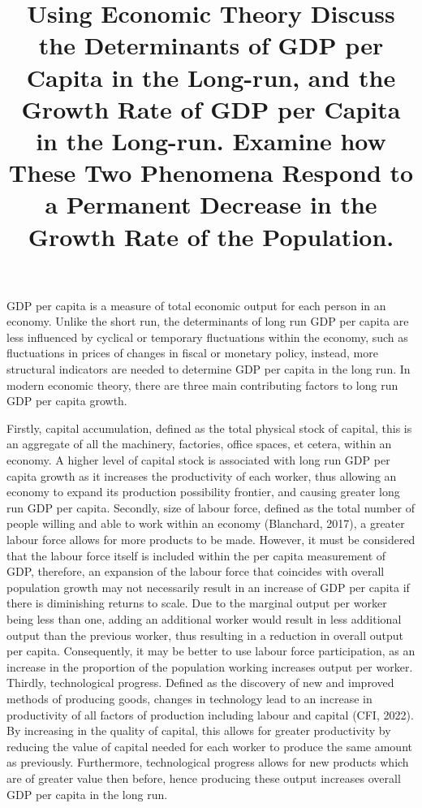 \documentclass[
]{article}
\title{Using Economic Theory Discuss the Determinants of GDP per Capita
in the Long-run, and the Growth Rate of GDP per Capita in the Long-run.
Examine how These Two Phenomena Respond to a Permanent Decrease in the
Growth Rate of the Population.}
\author{}
\date{}
\begin{document}
\maketitle

GDP per capita is a measure of total economic output for each person in
an economy. Unlike the short run, the determinants of long run GDP per
capita are less influenced by cyclical or temporary fluctuations within
the economy, such as fluctuations in prices of changes in fiscal or
monetary policy, instead, more structural indicators are needed to
determine GDP per capita in the long run. In modern economic theory,
there are three main contributing factors to long run GDP per capita
growth.

Firstly, capital accumulation, defined as the total physical stock of
capital, this is an aggregate of all the machinery, factories, office
spaces, et cetera, within an economy. A higher level of capital stock is
associated with long run GDP per capita growth as it increases the
productivity of each worker, thus allowing an economy to expand its
production possibility frontier, and causing greater long run GDP per
capita. Secondly, size of labour force, defined as the total number of
people willing and able to work within an economy (Blanchard, 2017), a
greater labour force allows for more products to be made. However, it
must be considered that the labour force itself is included within the
per capita measurement of GDP, therefore, an expansion of the labour
force that coincides with overall population growth may not necessarily
result in an increase of GDP per capita if there is diminishing returns
to scale. Due to the marginal output per worker being less than one,
adding an additional worker would result in less additional output than
the previous worker, thus resulting in a reduction in overall output per
capita. Consequently, it may be better to use labour force
participation, as an increase in the proportion of the population
working increases output per worker. Thirdly, technological progress.
Defined as the discovery of new and improved methods of producing goods,
changes in technology lead to an increase in productivity of all factors
of production including labour and capital (CFI, 2022). By increasing in
the quality of capital, this allows for greater productivity by reducing
the value of capital needed for each worker to produce the same amount
as previously. Furthermore, technological progress allows for new
products which are of greater value then before, hence producing these
output increases overall GDP per capita in the long run.
\end{document}
